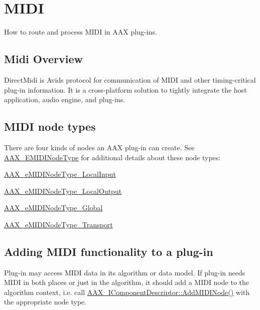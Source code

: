 \hypertarget{a00806}{}\section{M\+I\+DI}
\label{a00806}
How to route and process M\+I\+DI in A\+AX plug-\/ins. 

\hypertarget{a00806_additionalFeatures_MIDI_Overview}{}\subsection{Midi Overview}\label{a00806_additionalFeatures_MIDI_Overview}
Direct\+Midi is Avid\textquotesingle{}s protocol for communication of M\+I\+DI and other timing-\/critical plug-\/in information. It is a cross-\/platform solution to tightly integrate the host application, audio engine, and plug-\/ins.\hypertarget{a00806_additionalFeatures_MIDI_NodeTypes}{}\subsection{M\+I\+D\+I node types}\label{a00806_additionalFeatures_MIDI_NodeTypes}
There are four kinds of nodes an A\+AX plug-\/in can create. See \mbox{\hyperlink{a00491_a5e1dffce35d05990dbbad651702678e4}{A\+A\+X\+\_\+\+E\+M\+I\+D\+I\+Node\+Type}} for additional details about these node types\+: \begin{DoxyItemize}
\item \mbox{\hyperlink{a00491_a5e1dffce35d05990dbbad651702678e4ae57de2b04978fe2e75f5bdeb034bda44}{A\+A\+X\+\_\+e\+M\+I\+D\+I\+Node\+Type\+\_\+\+Local\+Input}} \item \mbox{\hyperlink{a00491_a5e1dffce35d05990dbbad651702678e4acc1b5f2109c508b20a65b5e0fdcd643f}{A\+A\+X\+\_\+e\+M\+I\+D\+I\+Node\+Type\+\_\+\+Local\+Output}} \item \mbox{\hyperlink{a00491_a5e1dffce35d05990dbbad651702678e4a2be91828f8c1dac20ab5dff136fc1fce}{A\+A\+X\+\_\+e\+M\+I\+D\+I\+Node\+Type\+\_\+\+Global}} \item \mbox{\hyperlink{a00491_a5e1dffce35d05990dbbad651702678e4ac2ff856aec0724907dfd95b8e3ccbc20}{A\+A\+X\+\_\+e\+M\+I\+D\+I\+Node\+Type\+\_\+\+Transport}}\end{DoxyItemize}
\hypertarget{a00806_additionalFeatures_MIDI_AddingMIDI}{}\subsection{Adding M\+I\+D\+I functionality to a plug-\/in}\label{a00806_additionalFeatures_MIDI_AddingMIDI}
Plug-\/in may access M\+I\+DI data in its algorithm or data model. If plug-\/in needs M\+I\+DI in both places or just in the algorithm, it should add a M\+I\+DI node to the algorithm context, i.\+e. call \mbox{\hyperlink{a01781_a6284dda9ccca898e33075de29dad4e39}{A\+A\+X\+\_\+\+I\+Component\+Descriptor\+::\+Add\+M\+I\+D\+I\+Node()}} with the appropriate node type.


